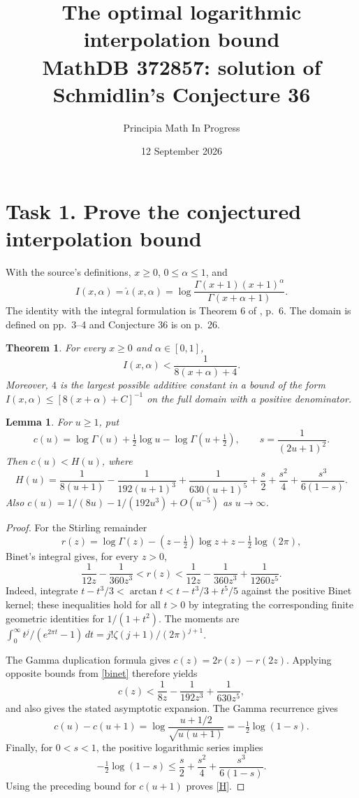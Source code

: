 \documentclass[11pt]{article}
\title{The optimal logarithmic interpolation bound\\
\large MathDB 372857: solution of Schmidlin's Conjecture 36}
\author{Principia Math In Progress}
\date{12 September 2026}
\newtheorem{theorem}{Theorem}
\newtheorem{lemma}{Lemma}
\begin{document}
\maketitle

\section*{Task 1. Prove the conjectured interpolation bound}
With the source's definitions, \(x\geq0\), \(0\leq\alpha\leq1\), and
\[
 I(x,\alpha)=\widehat\iota(x,\alpha)
 =\log\frac{\Gamma(x+1)(x+1)^\alpha}{\Gamma(x+\alpha+1)}.
\]
The identity with the integral formulation is Theorem 6 of
\cite{Schmidlin}, p.~6. The domain is defined on pp.~3--4 and
Conjecture 36 is on p.~26.

\begin{theorem}\label{main}
For every \(x\geq0\) and \(\alpha\in[0,1]\),
\begin{equation}\label{target}
 I(x,\alpha)<\frac1{8(x+\alpha)+4}.
\end{equation}
Moreover, \(4\) is the largest possible additive constant in a
bound of the form \(I(x,\alpha)\leq[8(x+\alpha)+C]^{-1}\)
on the full domain with a positive denominator.
\end{theorem}

\begin{lemma}\label{center}
For \(u\geq1\), put
\[
 c(u)=\log\Gamma(u)+\tfrac12\log u-\log\Gamma(u+\tfrac12),
 \qquad s=\frac1{(2u+1)^2}.
\]
Then \(c(u)<H(u)\), where
\begin{equation}\label{H}
 H(u)=\frac1{8(u+1)}-\frac1{192(u+1)^3}+\frac1{630(u+1)^5}
      +\frac{s}{2}+\frac{s^2}{4}+\frac{s^3}{6(1-s)}.
\end{equation}
Also \(c(u)=1/(8u)-1/(192u^3)+O(u^{-5})\) as \(u\to\infty\).
\end{lemma}
\begin{proof}
For the Stirling remainder
\[
 r(z)=\log\Gamma(z)-(z-\tfrac12)\log z+z-\tfrac12\log(2\pi),
\]
Binet's integral \cite[Eq.~5.9.10]{DLMF} gives, for every \(z>0\),
\begin{equation}\label{binet}
 \frac1{12z}-\frac1{360z^3}<r(z)
 <\frac1{12z}-\frac1{360z^3}+\frac1{1260z^5}.
\end{equation}
Indeed, integrate
\(t-t^3/3<\arctan t<t-t^3/3+t^5/5\) against the positive
Binet kernel; these inequalities hold for all \(t>0\) by integrating
the corresponding finite geometric identities for \(1/(1+t^2)\).
The moments are
\(\int_0^\infty t^j/(e^{2\pi t}-1)\,dt=j!\zeta(j+1)/(2\pi)^{j+1}\).

The Gamma duplication formula gives \(c(z)=2r(z)-r(2z)\).
Applying opposite bounds from \eqref{binet} therefore yields
\[
 c(z)<\frac1{8z}-\frac1{192z^3}+\frac1{630z^5},
\]
and also gives the stated asymptotic expansion.
The Gamma recurrence gives
\[
 c(u)-c(u+1)=\log\frac{u+1/2}{\sqrt{u(u+1)}}
            =-\tfrac12\log(1-s).
\]
Finally, for \(0<s<1\), the positive logarithmic series implies
\[
 -\tfrac12\log(1-s)
 \leq\frac{s}{2}+\frac{s^2}{4}+\frac{s^3}{6(1-s)}.
\]
Using the preceding bound for \(c(u+1)\) proves \eqref{H}.
\end{proof}
\end{document}
